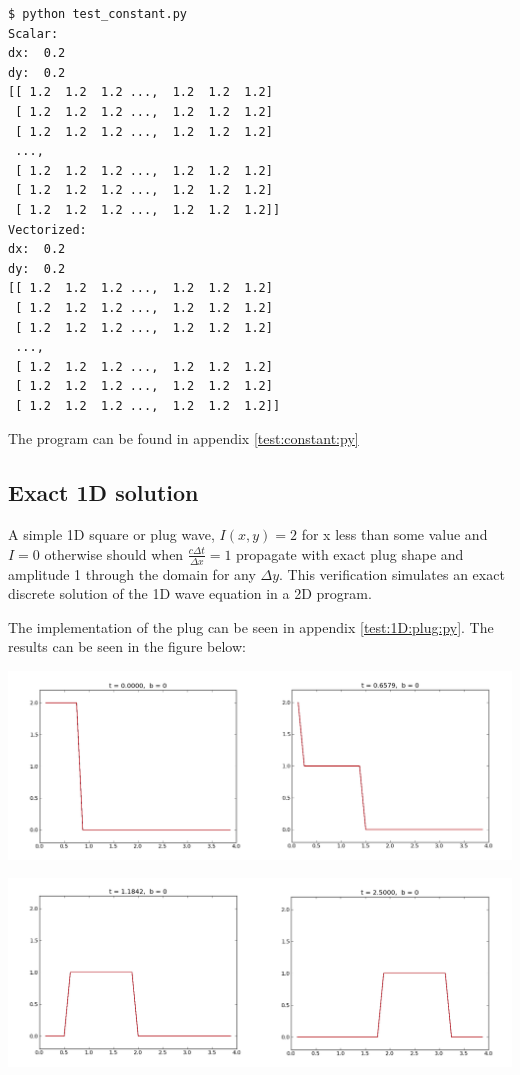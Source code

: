 \documentclass[twoside]{article}
\begin{document}
\begin{verbatim}
$ python test_constant.py 
Scalar:
dx:  0.2
dy:  0.2
[[ 1.2  1.2  1.2 ...,  1.2  1.2  1.2]
 [ 1.2  1.2  1.2 ...,  1.2  1.2  1.2]
 [ 1.2  1.2  1.2 ...,  1.2  1.2  1.2]
 ..., 
 [ 1.2  1.2  1.2 ...,  1.2  1.2  1.2]
 [ 1.2  1.2  1.2 ...,  1.2  1.2  1.2]
 [ 1.2  1.2  1.2 ...,  1.2  1.2  1.2]]
Vectorized:
dx:  0.2
dy:  0.2
[[ 1.2  1.2  1.2 ...,  1.2  1.2  1.2]
 [ 1.2  1.2  1.2 ...,  1.2  1.2  1.2]
 [ 1.2  1.2  1.2 ...,  1.2  1.2  1.2]
 ..., 
 [ 1.2  1.2  1.2 ...,  1.2  1.2  1.2]
 [ 1.2  1.2  1.2 ...,  1.2  1.2  1.2]
 [ 1.2  1.2  1.2 ...,  1.2  1.2  1.2]]
\end{verbatim}

The program can be found in appendix \ref{test:constant:py}


\subsection{Exact 1D solution}


A simple 1D square or plug wave, $I(x,y)=2$ for x less than some value and $I=0$ otherwise should when $\frac{c\Delta t}{\Delta x} = 1$ propagate with exact plug shape and amplitude 1 through the domain for any $\Delta y$. This verification simulates an exact discrete solution of the 1D wave equation in a 2D program. 

The implementation of the plug can be seen in appendix \ref{test:1D:plug:py}. The results can be seen in the figure below:

\begin{center}  %
  \centerline{\includegraphics[width=0.9\linewidth]{1Dpluga.png}}
  \centerline{\includegraphics[width=0.9\linewidth]{1Dplugb.png}}
\end{center}
\end{document}
